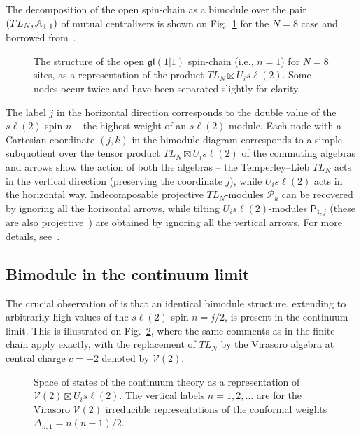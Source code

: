 \documentclass[11pt]{article}
\newcommand{\TL}[1]{TL_{#1}}
\newcommand{\LQGi}{U_{i} s\ell(2)}
\newcommand{\Vir}{\mathcal{V}}
\newcommand{\gl}{\mathfrak{gl}}
\newcommand{\PP}{\mathsf{P}}
\newcommand{\PrTL}[1]{\mathscr{P}_{#1}}
\theoremstyle{definition}
\begin{document}
The decomposition of the open spin-chain as a bimodule over the pair
$(\TL{N},{\cal A}_{1|1})$ of mutual centralizers
is shown on Fig.~\ref{openbimodule-fin} for  the $N=8$ case and borrowed
from~\cite{ReadSaleur07-2}.
 \begin{figure}\centering
 \leavevmode
  \caption{The structure of the open $\gl(1|1)$ spin-chain (i.e., $n=1$) for $N=8$
  sites, as a representation of the product $\TL{N}\boxtimes\LQGi$. Some nodes
  occur twice and have been separated slightly for
  clarity.}\label{openbimodule-fin}
 \end{figure}
The label $j$ in the horizontal direction  corresponds  to
the double value of the $s\ell(2)$ spin $n$ -- the highest weight of
an $s\ell(2)$-module.  Each node with a Cartesian coordinate $(j,k)$ in the bimodule
diagram corresponds to a simple subquotient over the tensor product
$\TL{N}\boxtimes\LQGi$ of the commuting algebras and arrows show the action of both the algebras --
the Temperley--Lieb $\TL{N}$ acts in the vertical direction
(preserving the coordinate $j$), while $\LQGi$ acts in the horizontal
way.  Indecomposable projective $\TL{N}$-modules $\PrTL{k}$ can be
recovered by ignoring all the horizontal arrows, while tilting
$\LQGi$-modules $\PP_{1,j}$ (these are also projective~\cite{BFGT}) are obtained
by ignoring all the vertical arrows. For more details, see~\cite{ReadSaleur07-2,GRS2}.

\subsection{Bimodule in the continuum limit}\label{subsec:bimodopen}

The crucial observation of \cite{ReadSaleur07-2} is that an identical
bimodule structure, extending to arbitrarily high values of the $s\ell(2)$ spin $n=j/2$, is
present in the continuum limit. This is illustrated on
Fig.~\ref{openbimodule-cont}, where the same comments as in the finite
chain apply exactly, with the replacement of $\TL{N}$ by the Virasoro
algebra at central charge $c=-2$ denoted by $\Vir(2)$.

  \begin{figure}\centering
 \leavevmode
  \caption{Space of states of the continuum theory  as a representation of $\Vir(2)\boxtimes\LQGi$. The vertical labels $n=1,2,\dots$  are for the Virasoro $\Vir(2)$ irreducible representations of the conformal weights $\Delta_{n,1}=n(n-1)/2$.}\label{openbimodule-cont}
 \end{figure}
\end{document}
